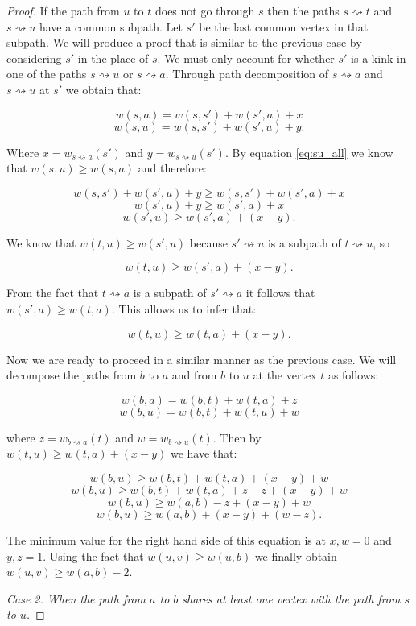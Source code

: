 \begin{proof}
If the path from $u$ to $t$ does not go through $s$ then the paths $s \rightsquigarrow t$ and $s \rightsquigarrow u$ have a common subpath. Let $s'$ be the last common vertex in that subpath. We will produce a proof that is similar to the previous case by considering $s'$ in the place of $s$. We must only account for whether $s'$ is a kink in one of the paths $s \rightsquigarrow u$ or $s \rightsquigarrow a$. Through path decomposition of $s \rightsquigarrow a$ and $s \rightsquigarrow u$ at $s'$ we obtain that:

$$ w(s, a) = w(s, s') + w(s', a) + x $$
$$ w(s, u) = w(s, s') + w(s', u) + y .$$

Where $x = w_{s \rightsquigarrow a}(s')$ and $y = w_{s \rightsquigarrow u}(s')$. By equation \ref{eq:su_all} we know that $w(s, u) \ge w(s, a)$ and therefore:

$$ w(s, s') + w(s', u) + y \ge w(s, s') + w(s', a) + x  $$
$$ w(s', u) + y \ge w(s', a) + x $$
$$ w(s', u) \ge w(s', a) + (x - y).$$

We know that $w(t, u) \ge w(s', u)$ because $s' \rightsquigarrow u$ is a subpath of $t \rightsquigarrow u$, so

$$ w(t, u) \ge w(s', a) + (x - y).$$

From the fact that $t \rightsquigarrow a$ is a subpath of $s' \rightsquigarrow a$ it follows that $w(s', a) \ge w(t, a)$. This allows us to infer that:

$$ w(t, u) \ge w(t, a) + (x - y). $$

Now we are ready to proceed in a similar manner as the previous case. We will decompose the paths from $b$ to $a$ and from $b$ to $u$ at the vertex $t$ as follows:

$$ w(b, a) = w(b, t) + w(t, a) + z  $$
$$ w(b, u) = w(b, t) + w(t, u) + w  $$

where $z = w_{b \rightsquigarrow a}(t)$ and $w = w_{b \rightsquigarrow u}(t)$. Then by $w(t, u) \ge w(t, a) + (x - y)$ we have that:

$$ w(b, u) \ge w(b, t) + w(t, a) + (x - y) + w $$
$$ w(b, u) \ge w(b, t) + w(t, a) + z - z + (x - y) + w $$
$$ w(b, u) \ge w(a, b) - z + (x - y) + w $$
$$ w(b, u) \ge w(a, b) + (x - y) + (w - z) .$$

The minimum value for the right hand side of this equation is at $x, w = 0$ and $y, z = 1$. Using the fact that $w(u, v) \ge w(u, b)$ we finally obtain $ w(u, v) \ge w(a, b) - 2 $.


{\em Case 2. When the path from $a$ to $b$ shares at least one vertex with the path from $s$ to $u$.}


\end{proof}
